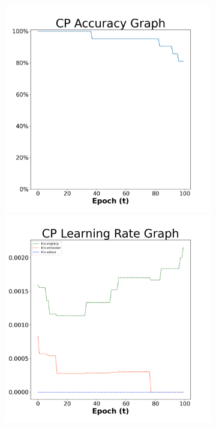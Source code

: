 \begin{figure}[H]
    \centering %
\begin{subfigure}{0.3\textwidth}
  \includegraphics[width=\linewidth]{images/exper1/iris/CP_0.01_acc.png}
    \includegraphics[width=\linewidth]{images/exper1/iris/CP_0.01_lr.png}

\end{subfigure}
\end{figure}

